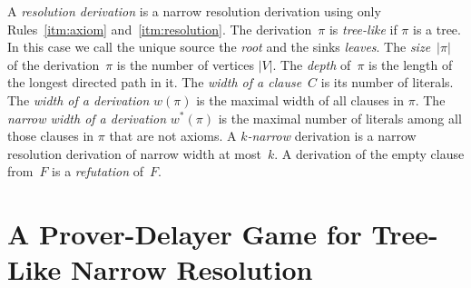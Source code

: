 \documentclass[10pt,a4paper]{article}
\newcommand{\defining}[1]{\emph{#1}}
\begin{document}
\noindent A \defining{resolution derivation} is a narrow resolution derivation using only Rules~\ref{itm:axiom} and~\ref{itm:resolution}.
The derivation~$\pi$ is \defining{tree-like} if $\pi$ is a tree. In this case we call the unique source the \defining{root} and the sinks \defining{leaves}. 
The \defining{size}~$|\pi|$ of the derivation~$\pi$
is the number of vertices $|V|$.
The \defining{depth} of~$\pi$ is the length of the longest directed path in it.
The \defining{width of a clause}~$C$ is its number of literals.
The \defining{width of a derivation} $w(\pi)$ is the maximal width of all clauses in $\pi$.
The \defining{narrow width of a derivation} $w^{\ast}(\pi)$ is the maximal number of literals among all those clauses in $\pi$ that are not axioms.
A \defining{$k$-narrow} derivation is a narrow resolution derivation of narrow width at most~$k$.
A derivation of the empty clause from~$F$ is a \defining{refutation} of~$F$.




%
%
%
%
         
        \section{A Prover-Delayer Game for Tree-Like Narrow Resolution} \label{sec: Prover}
\end{document}
